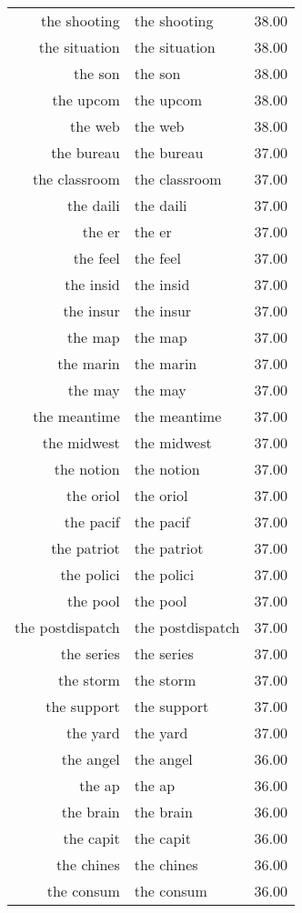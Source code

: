 \begin{table}[ht]
\begin{tabular}{rlr}
  the shooting & the shooting & 38.00 \\ 
  the situation & the situation & 38.00 \\ 
  the son & the son & 38.00 \\ 
  the upcom & the upcom & 38.00 \\ 
  the web & the web & 38.00 \\ 
  the bureau & the bureau & 37.00 \\ 
  the classroom & the classroom & 37.00 \\ 
  the daili & the daili & 37.00 \\ 
  the er & the er & 37.00 \\ 
  the feel & the feel & 37.00 \\ 
  the insid & the insid & 37.00 \\ 
  the insur & the insur & 37.00 \\ 
  the map & the map & 37.00 \\ 
  the marin & the marin & 37.00 \\ 
  the may & the may & 37.00 \\ 
  the meantime & the meantime & 37.00 \\ 
  the midwest & the midwest & 37.00 \\ 
  the notion & the notion & 37.00 \\ 
  the oriol & the oriol & 37.00 \\ 
  the pacif & the pacif & 37.00 \\ 
  the patriot & the patriot & 37.00 \\ 
  the polici & the polici & 37.00 \\ 
  the pool & the pool & 37.00 \\ 
  the postdispatch & the postdispatch & 37.00 \\ 
  the series & the series & 37.00 \\ 
  the storm & the storm & 37.00 \\ 
  the support & the support & 37.00 \\ 
  the yard & the yard & 37.00 \\ 
  the angel & the angel & 36.00 \\ 
  the ap & the ap & 36.00 \\ 
  the brain & the brain & 36.00 \\ 
  the capit & the capit & 36.00 \\ 
  the chines & the chines & 36.00 \\ 
  the consum & the consum & 36.00 \\ 

\end{tabular}
\end{table}
